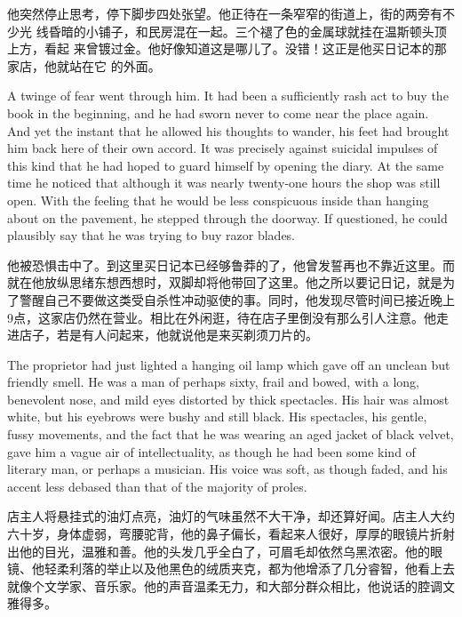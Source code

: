 \begin{paracol}{2}
\switchcolumn

他突然停止思考，停下脚步四处张望。他正待在一条窄窄的街道上，街的两旁有不少光
线昏暗的小铺子，和民房混在一起。三个褪了色的金属球就挂在温斯顿头顶上方，看起
来曾镀过金。他好像知道这是哪儿了。没错！这正是他买日记本的那家店，他就站在它
的外面。

\switchcolumn*

A twinge of fear went through him. It had been a sufficiently rash act
to buy the book in the beginning, and he had sworn never to come near
the place again. And yet the instant that he allowed his thoughts to
wander, his feet had brought him back here of their own accord. It was
precisely against suicidal impulses of this kind that he had hoped to
guard himself by opening the diary. At the same time he noticed that
although it was nearly twenty-one hours the shop was still open. With
the feeling that he would be less conspicuous inside than hanging about
on the pavement, he stepped through the doorway. If questioned, he could
plausibly say that he was trying to buy razor blades.

\switchcolumn

他被恐惧击中了。到这里买日记本已经够鲁莽的了，他曾发誓再也不靠近这里。而就在他放纵思绪东想西想时，双脚却将他带回了这里。他之所以要记日记，就是为了警醒自己不要做这类受自杀性冲动驱使的事。同时，他发现尽管时间已接近晚上9点，这家店仍然在营业。相比在外闲逛，待在店子里倒没有那么引人注意。他走进店子，若是有人问起来，他就说他是来买剃须刀片的。

\switchcolumn*

The proprietor had just lighted a hanging oil lamp which gave off an
unclean but friendly smell. He was a man of perhaps sixty, frail and
bowed, with a long, benevolent nose, and mild eyes distorted by thick
spectacles. His hair was almost white, but his eyebrows were bushy and
still black. His spectacles, his gentle, fussy movements, and the fact
that he was wearing an aged jacket of black velvet, gave him a vague air
of intellectuality, as though he had been some kind of literary man, or
perhaps a musician. His voice was soft, as though faded, and his accent
less debased than that of the majority of proles.

\switchcolumn

店主人将悬挂式的油灯点亮，油灯的气味虽然不大干净，却还算好闻。店主人大约六十岁，身体虚弱，弯腰驼背，他的鼻子偏长，看起来人很好，厚厚的眼镜片折射出他的目光，温雅和善。他的头发几乎全白了，可眉毛却依然乌黑浓密。他的眼镜、他轻柔利落的举止以及他黑色的绒质夹克，都为他增添了几分睿智，他看上去就像个文学家、音乐家。他的声音温柔无力，和大部分群众相比，他说话的腔调文雅得多。


\end{paracol}
